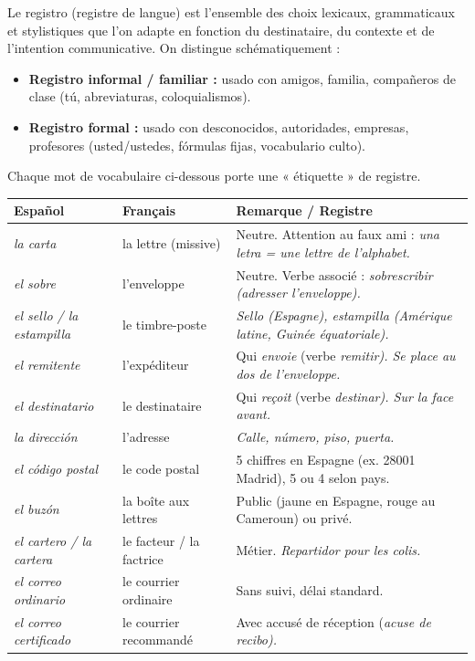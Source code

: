 \documentclass[11pt]{article}
\newcommand{\cle}[1]{{\popxbold\color{popdark}#1}}
\newcommand{\esp}[1]{\ifmmode\text{\textit{#1}}\else\begingroup\selectlanguage{spanish}\itshape #1\endgroup\fi}
\begin{document}
\begin{definition}
Le \cle{registro} (registre de langue) est l'ensemble des choix lexicaux, grammaticaux et stylistiques que l'on adapte en fonction du destinataire, du contexte et de l'intention communicative. On distingue schématiquement :
\begin{itemize}
    \item \textbf{Registro informal / familiar :} usado con amigos, familia, compañeros de clase (tú, abreviaturas, coloquialismos).
    \item \textbf{Registro formal :} usado con desconocidos, autoridades, empresas, profesores (usted/ustedes, fórmulas fijas, vocabulario culto).
\end{itemize}
Chaque mot de vocabulaire ci-dessous porte une « étiquette » de registre.
\end{definition}

\begin{center}
\begin{tabularx}{\linewidth}{|X|X|X|}
\hline
\rowcolor{popblueL}
\textbf{Español} & \textbf{Français} & \textbf{Remarque / Registre} \\
\hline
\esp{la carta} & la lettre (missive) & Neutre. Attention au faux ami : \esp{una letra} = une lettre de l'alphabet. \\
\hline
\esp{el sobre} & l'enveloppe & Neutre. Verbe associé : \esp{sobrescribir} (adresser l'enveloppe). \\
\hline
\esp{el sello} / \esp{la estampilla} & le timbre-poste & \esp{Sello} (Espagne), \esp{estampilla} (Amérique latine, Guinée équatoriale). \\
\hline
\esp{el remitente} & l'expéditeur & Qui \emph{envoie} (verbe \esp{remitir}). Se place au dos de l'enveloppe. \\
\hline
\esp{el destinatario} & le destinataire & Qui \emph{reçoit} (verbe \esp{destinar}). Sur la face avant. \\
\hline
\esp{la dirección} & l'adresse & \esp{Calle, número, piso, puerta}. \\
\hline
\esp{el código postal} & le code postal & 5 chiffres en Espagne (ex. 28001 Madrid), 5 ou 4 selon pays. \\
\hline
\esp{el buzón} & la boîte aux lettres & Public (jaune en Espagne, rouge au Cameroun) ou privé. \\
\hline
\esp{el cartero} / \esp{la cartera} & le facteur / la factrice & Métier. \esp{Repartidor} pour les colis. \\
\hline
\esp{el correo ordinario} & le courrier ordinaire & Sans suivi, délai standard. \\
\hline
\esp{el correo certificado} & le courrier recommandé & Avec accusé de réception (\esp{acuse de recibo}). \\
\hline
\end{tabularx}
\end{center}
\end{document}
